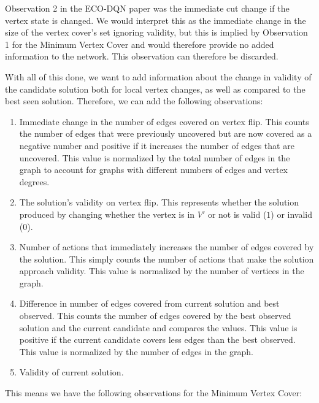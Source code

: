 \documentclass{article}
\begin{document}
Observation 2 in the ECO-DQN paper was the immediate cut change if the vertex state is changed. We would interpret this as the immediate change in the size of the vertex cover's set ignoring validity, but this is implied by Observation 1 for the Minimum Vertex Cover and would therefore provide no added information to the network. This observation can therefore be discarded.

With all of this done, we want to add information about the change in validity of the candidate solution both for local vertex changes, as well as compared to the best seen solution. Therefore, we can add the following observations:

\begin{enumerate}
    \item Immediate change in the number of edges covered on vertex flip. This counts the number of edges that were previously uncovered but are now covered as a negative number and positive if it increases the number of edges that are uncovered. This value is normalized by the total number of edges in the graph to account for graphs with different numbers of edges and vertex degrees.
    \item The solution's validity on vertex flip. This represents whether the solution produced by changing whether the vertex is in $V'$ or not is valid ($1$) or invalid ($0$). 
    \item Number of actions that immediately increases the number of edges covered by the solution. This simply counts the number of actions that make the solution approach validity. This value is normalized by the number of vertices in the graph.
    \item Difference in number of edges covered from current solution and best observed. This counts the number of edges covered by the best observed solution and the current candidate and compares the values. This value is positive if the current candidate covers less edges than the best observed. This value is normalized by the number of edges in the graph.
    \item Validity of current solution. 
\end{enumerate}

This means we have the following observations for the Minimum Vertex Cover:
\end{document}
